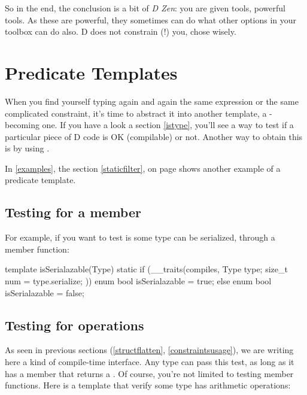 So in the end, the conclusion is a bit of \emph{D Zen}: you are given tools, powerful tools. As these are powerful, they sometimes can do what other options in your toolbox can do also. D does not constrain (!) you, chose wisely.

\section{Predicate Templates}\label{predicates}

When you find yourself typing again and again the same  expression or the same complicated constraint, it's time to abstract it into another template, a -becoming one. If you have a look a section \ref{istype}, you'll see a way to test if a particular piece of D code is OK (compilable) or not. Another way to obtain this is by using .

In \autoref{examples}, the section \ref{staticfilter}, on page \pageref{graphcheck} shows another example of a predicate template.

\subsection{Testing for a member}

For example, if you want to test is some type can be serialized, through a  member function:

\begin{dcode}
template isSerialazable(Type)
{
    static if (__traits(compiles, {
                                   Type type;
                                   size_t num = type.serialize;
                                  }))
        enum bool isSerialazable = true;
    else
        enum bool isSerialazable = false;
}
\end{dcode}

\subsection{Testing for operations}

As seen in previous sections (\ref{structflatten}, \ref{constraintsusage}), we are writing here a kind of compile-time interface. Any type can pass this test, as long as it has a  member that returns a . Of course, you're not limited to testing member functions. Here is a template that verify some type has arithmetic operations:

